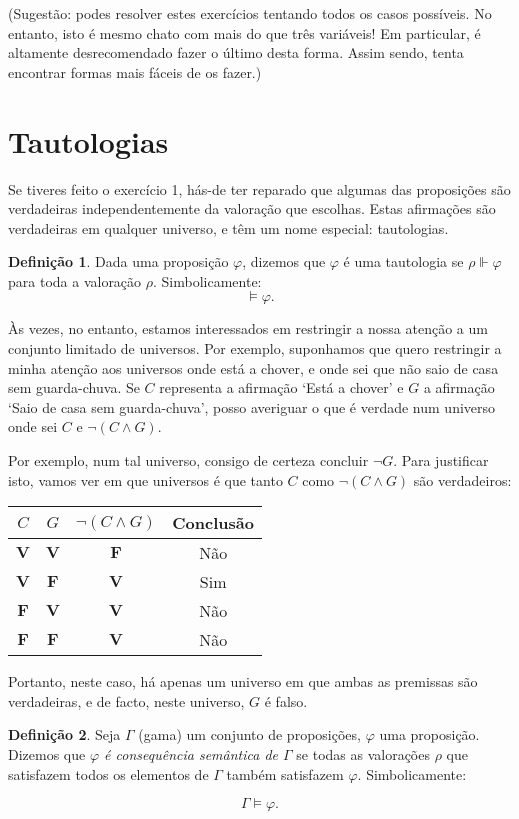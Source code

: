 \documentclass{article}
\theoremstyle{definition}
\newtheorem{definicao}{Definição}
\theoremstyle{remark}
\newcommand{\V}{\mathbf{V}}
\newcommand{\F}{\mathbf{F}}
\begin{document}
	(Sugestão: podes resolver estes exercícios tentando todos os casos possíveis. No entanto, isto é mesmo chato com mais do que três variáveis! Em particular, é altamente desrecomendado fazer o último desta forma. Assim sendo, tenta encontrar formas mais fáceis de os fazer.)
	
	\section{Tautologias}
	
	Se tiveres feito o exercício 1, hás-de ter reparado que algumas das proposições são verdadeiras independentemente da valoração que escolhas. Estas afirmações são verdadeiras em qualquer universo, e têm um nome especial: tautologias.
	
	\begin{definicao}
	Dada uma proposição $\varphi$, dizemos que $\varphi$ é uma tautologia se $\rho \Vdash \varphi$ para toda a valoração $\rho$. Simbolicamente:
	\[\vDash \varphi.\]
	\end{definicao}
	
	Às vezes, no entanto, estamos interessados em restringir a nossa atenção a um conjunto limitado de universos. Por exemplo, suponhamos que quero restringir a minha atenção aos universos onde está a chover, e onde sei que não saio de casa sem guarda-chuva. Se $C$ representa a afirmação `Está a chover' e $G$ a afirmação `Saio de casa sem guarda-chuva', posso averiguar o que é verdade num universo onde sei $C$ e $\neg (C \land G)$.
	
	Por exemplo, num tal universo, consigo de certeza concluir $\neg G$. Para justificar isto, vamos ver em que universos é que tanto $C$ como $\neg (C \land G)$ são verdadeiros:
	
	\begin{tabular}{|c|c|c|c|}
	\hline
	$C$ & $G$ & $\neg(C \land G)$ & Conclusão \\
	\hline
	$\V$ & $\V$ & $\F$ & Não \\
	$\V$ & $\F$ & $\V$ & Sim \\
	$\F$ & $\V$ & $\V$ & Não \\
	$\F$ & $\F$ & $\V$ & Não \\
	\hline
	\end{tabular}
	\smallskip
	
	Portanto, neste caso, há apenas um universo em que ambas as premissas são verdadeiras, e de facto, neste universo, $G$ é falso.
	
	\begin{definicao}
	Seja $\Gamma$ (gama) um conjunto de proposições, $\varphi$ uma proposição. Dizemos que \emph{$\varphi$ é consequência semântica de $\Gamma$} se todas as valorações $\rho$ que satisfazem todos os elementos de $\Gamma$ também satisfazem $\varphi$. Simbolicamente:
	
	\[\Gamma \vDash \varphi.\]
	\end{definicao}
	
\end{document}
